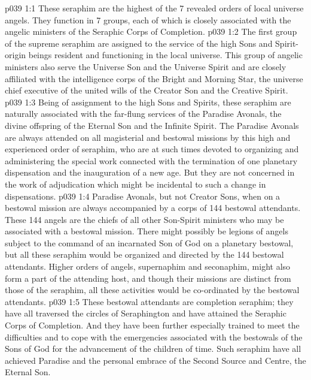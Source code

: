 \vs p039 1:1 These seraphim are the highest of the 7 revealed orders of local universe angels. They function in 7 groups, each of which is closely associated with the angelic ministers of the Seraphic Corps of Completion.
\vs p039 1:2 \bibnobreakspace {} The first group of the supreme seraphim are assigned to the service of the high Sons and Spirit\hyp{}origin beings resident and functioning in the local universe. This group of angelic ministers also serve the Universe Son and the Universe Spirit and are closely affiliated with the intelligence corps of the Bright and Morning Star, the universe chief executive of the united wills of the Creator Son and the Creative Spirit.
\vs p039 1:3 Being of assignment to the high Sons and Spirits, these seraphim are naturally associated with the far\hyp{}flung services of the Paradise Avonals, the divine offspring of the Eternal Son and the Infinite Spirit. The Paradise Avonals are always attended on all magisterial and bestowal missions by this high and experienced order of seraphim, who are at such times devoted to organizing and administering the special work connected with the termination of one planetary dispensation and the inauguration of a new age. But they are not concerned in the work of adjudication which might be incidental to such a change in dispensations.
\vs p039 1:4 \pc {} Paradise Avonals, but not Creator Sons, when on a bestowal mission are always accompanied by a corps of 144 bestowal attendants. These 144 angels are the chiefs of all other Son\hyp{}Spirit ministers who may be associated with a bestowal mission. There might possibly be legions of angels subject to the command of an incarnated Son of God on a planetary bestowal, but all these seraphim would be organized and directed by the 144 bestowal attendants. Higher orders of angels, supernaphim and seconaphim, might also form a part of the attending host, and though their missions are distinct from those of the seraphim, all these activities would be co\hyp{}ordinated by the bestowal attendants.
\vs p039 1:5 These bestowal attendants are completion seraphim; they have all traversed the circles of Seraphington and have attained the Seraphic Corps of Completion. And they have been further especially trained to meet the difficulties and to cope with the emergencies associated with the bestowals of the Sons of God for the advancement of the children of time. Such seraphim have all achieved Paradise and the personal embrace of the Second Source and Centre, the Eternal Son.
